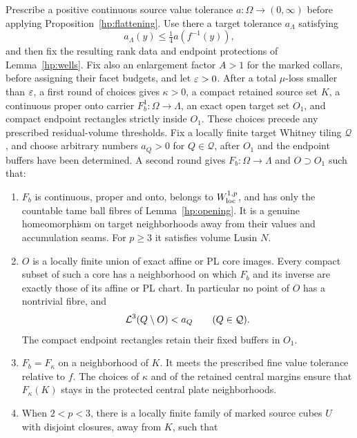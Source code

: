 \begin{proposition}\label{hp:carrier}
Prescribe a positive continuous source value tolerance
$a:\Omega\to(0,\infty)$ before applying Proposition~\ref{hp:flattening}.
Use there a target tolerance $a_\Lambda$ satisfying
\[
 a_\Lambda(y)\leq\tfrac14 a(f^{-1}(y)),
\]
and then fix the resulting rank data and endpoint protections of
Lemma~\ref{hp:wells}.  Fix also an enlargement factor $A>1$ for the
marked collars, before assigning their facet budgets, and let $\varepsilon>0$.
After a total $\mu$-loss smaller than $\varepsilon$, a first round of choices
gives $\kappa>0$, a compact retained source set $K$, a continuous
proper onto carrier $F_b^1:\Omega\to\Lambda$, an exact open target
set $O_1$, and compact endpoint rectangles strictly inside $O_1$.
These choices precede any prescribed residual-volume thresholds.
Fix a locally finite target Whitney tiling $\mathcal Q$, and choose
arbitrary numbers $a_Q>0$ for $Q\in\mathcal Q$, after $O_1$ and the
endpoint buffers have been determined.  A second round gives
$F_b:\Omega\to\Lambda$ and $O\supset O_1$ such that:
\begin{enumerate}[label=\textup{(\roman*)}]
\item $F_b$ is continuous, proper and onto, belongs to
$W^{1,p}_{\rm loc}$, and has only the countable tame ball fibres of
Lemma~\ref{hp:opening}.  It is a genuine homeomorphism on target
neighborhoods away from their values and accumulation seams.
For $p\geq3$ it satisfies volume Lusin $N$.
\item $O$ is a locally finite union of exact affine or PL core
images.  Every compact subset of such a core has a neighborhood on
which $F_b$ and its inverse are exactly those of its affine or PL
chart.  In particular no point of $O$ has a nontrivial fibre, and
\begin{equation}\label{hp:residual-volume}
 \mathcal L^3(Q\setminus O)<a_Q\qquad(Q\in\mathcal Q).
\end{equation}
The compact endpoint rectangles retain their fixed buffers in $O_1$.
\item $F_b=F_\kappa$ on a neighborhood of $K$.  It meets the
prescribed fine value tolerance relative to $f$.  The choices of
$\kappa$ and of the retained central margins ensure that
$F_\kappa(K)$ stays in the protected central plate neighborhoods.
\item When $2<p<3$, there is a locally finite family of marked
source cubes $U$ with disjoint closures, away from $K$, such that
\begin{equation}\label{hp:small-marked-mass}

\end{equation}
\end{enumerate}
\end{proposition}
